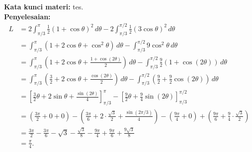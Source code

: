 \documentclass[10pt,openany,a4paper]{article}
\theoremstyle{definition}
\theoremstyle{definition}
\theoremstyle{plain}
\newenvironment{jawab}[2][tes]{
\textbf{Kata kunci materi:} #1.\\
\textbf{Penyelesaian:} #2
}{}
\begin{document}
\begin{enumerate}
\begin{jawab}
{                \begin{align*}
L &= 2\int_{\pi/3}^{\pi} \frac{1}{2}(1+\cos \theta)^2 \, d\theta - 2\int_{\pi/3}^{\pi/2} \frac{1}{2}(3\cos \theta)^2 \, d\theta\\
&= \int_{\pi/3}^{\pi} (1 + 2\cos \theta + \cos^2 \theta) \, d\theta - \int_{\pi/3}^{\pi/2} 9\cos^2 \theta \, d\theta\\
&= \int_{\pi/3}^{\pi} \left(1 + 2\cos \theta + \frac{1 + \cos(2\theta)}{2}\right) \, d\theta - \int_{\pi/3}^{\pi/2} \frac{9}{2}(1 + \cos(2\theta)) \,d\theta\\
&= \int_{\pi/3}^{\pi} \left(\frac{3}{2} + 2\cos \theta + \frac{\cos(2\theta)}{2}\right) \, d\theta - \int_{\pi/3}^{\pi/2} \left(\frac{9}{2} + \frac{9}{2}\cos(2\theta)\right) \, d\theta\\
&= \left[\frac{3}{2}\theta + 2\sin \theta + \frac{\sin(2\theta)}{4}\right]_{\pi/3}^{\pi} - \left[\frac{9}{2}\theta + \frac{9}{4}\sin(2\theta)\right]_{\pi/3}^{\pi/2}\\
&= \left(\frac{3\pi}{2} + 0 + 0\right) - \left(\frac{3\pi}{6} + 2\cdot \frac{\sqrt{3}}{2} + \frac{\sin(2\pi/3)}{4}\right) - \left(\frac{9\pi}{4} + 0\right) + \left(\frac{9\pi}{6} + \frac{9}{4}\cdot \frac{\sqrt{3}}{2}\right)\\
&= \frac{3\pi}{2} - \frac{3\pi}{6} - \sqrt{3} - \frac{\sqrt{3}}{8} - \frac{9\pi}{4} + \frac{9\pi}{6} + \frac{9\sqrt{3}}{8}\\
&=\frac{\pi}{4}.
                \end{align*}}
                \end{jawab}
            \end{enumerate}
\end{document}
